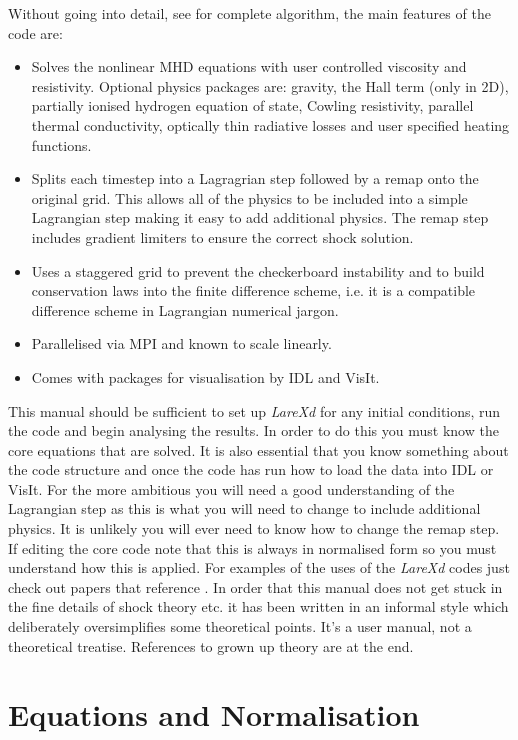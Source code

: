 \documentclass[11pt]{article}
\begin{document}
Without going into detail, see \cite{jcp} for complete algorithm, the main features of the code are:
\begin{itemize}
 \item Solves the nonlinear MHD equations with user controlled viscosity and resistivity. Optional physics packages are: gravity, the Hall term (only in 2D), partially ionised hydrogen equation of state, Cowling resistivity, parallel thermal conductivity, optically thin radiative losses and user specified heating functions.
 \item Splits each timestep into a Lagragrian step followed by a remap onto the original grid. This allows all of the physics to be included into a simple Lagrangian step making it easy to add additional physics. The remap step includes gradient limiters to ensure the correct shock solution.
 \item Uses a staggered grid to prevent the checkerboard instability and to build conservation laws into the finite difference scheme, i.e. it is a compatible difference scheme in Lagrangian numerical jargon.
 \item Parallelised via MPI and known to scale linearly.
 \item Comes with packages for visualisation by IDL and VisIt. \cite{visit}
\end{itemize}

This manual should be sufficient to set up {\it LareXd} for any initial conditions, run the code and begin analysing the results. In order to do this you must know the core equations that are solved. It is also essential that you know something about the code structure and once the code has run how to load the data into IDL or VisIt. For the more ambitious you will need a good understanding of the Lagrangian step as this is what you will need to change to include additional physics. It is unlikely you will ever need to know how to change the remap step. If editing the core code note that this is always in normalised form so you must understand how this is applied. For examples of the uses of the {\it LareXd} codes just check out papers that reference \cite{jcp}. In order that this manual does not get stuck in the fine details of shock theory etc. it has been written in an informal style which deliberately oversimplifies some theoretical points. It's a user manual, not a theoretical treatise. References to grown up theory are at the end.



\section{Equations and Normalisation}
\end{document}
